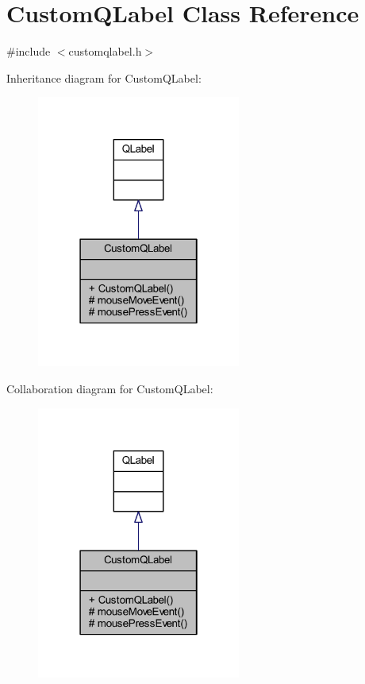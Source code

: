 \hypertarget{class_custom_q_label}{}\section{Custom\+Q\+Label Class Reference}
\label{class_custom_q_label}


{\ttfamily \#include $<$customqlabel.\+h$>$}



Inheritance diagram for Custom\+Q\+Label\+:\nopagebreak
\begin{figure}[H]
\begin{center}
\leavevmode
\includegraphics[width=190pt]{class_custom_q_label__inherit__graph}
\end{center}
\end{figure}


Collaboration diagram for Custom\+Q\+Label\+:\nopagebreak
\begin{figure}[H]
\begin{center}
\leavevmode
\includegraphics[width=190pt]{class_custom_q_label__coll__graph}
\end{center}
\end{figure}

